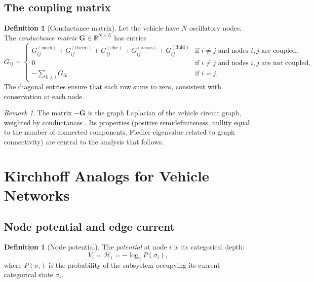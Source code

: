 \documentclass[twocolumn,10pt,a4paper]{article}
\theoremstyle{definition}
\newtheorem{definition}[theorem]{Definition}
\theoremstyle{remark}
\newtheorem{remark}[theorem]{Remark}
\newcommand{\R}{\mathbb{R}}
\newcommand{\mat}[1]{\mathbf{#1}}
\begin{document}
\subsection{The coupling matrix}

\begin{definition}[Conductance matrix]\label{def:conductance_matrix}
Let the vehicle have $N$ oscillatory nodes. The \emph{conductance matrix} $\mat{G} \in \R^{N \times N}$ has entries
\begin{equation}\label{eq:conductance_matrix}
G_{ij} = \begin{cases}
G_{ij}^{(\mathrm{mech})} + G_{ij}^{(\mathrm{therm})} + G_{ij}^{(\mathrm{elec})} + G_{ij}^{(\mathrm{acous})} + G_{ij}^{(\mathrm{fluid})} & \text{if } i \neq j \text{ and nodes } i, j \text{ are coupled}, \\
0 & \text{if } i \neq j \text{ and nodes } i, j \text{ are not coupled}, \\
-\sum_{k \neq i} G_{ik} & \text{if } i = j.
\end{cases}
\end{equation}
The diagonal entries ensure that each row sums to zero, consistent with conservation at each node.
\end{definition}

\begin{remark}
The matrix $-\mat{G}$ is the graph Laplacian of the vehicle circuit graph, weighted by conductances \citep{Chung1997}. Its properties (positive semidefiniteness, nullity equal to the number of connected components, Fiedler eigenvalue related to graph connectivity) are central to the analysis that follows.
\end{remark}


\section{Kirchhoff Analogs for Vehicle Networks}\label{sec:kirchhoff}

\subsection{Node potential and edge current}

\begin{definition}[Node potential]\label{def:node_potential}
The \emph{potential} at node $i$ is its categorical depth:
\begin{equation}\label{eq:node_potential}
V_i = \mathcal{H}_i = -\log_2 P(\sigma_i),
\end{equation}
where $P(\sigma_i)$ is the probability of the subsystem occupying its current categorical state $\sigma_i$.
\end{definition}
\end{document}
